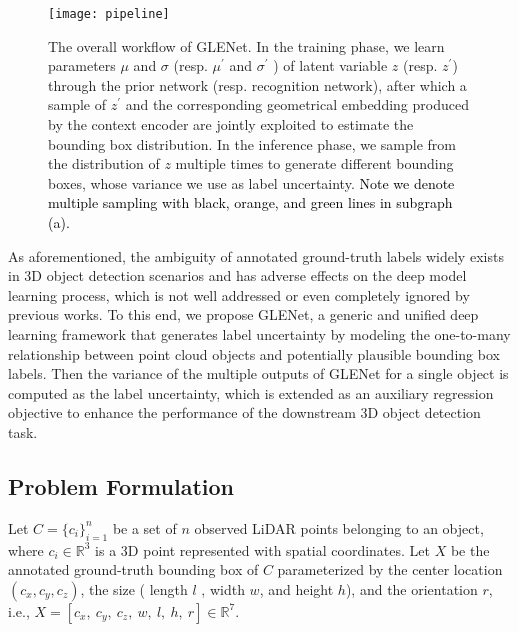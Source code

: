 \documentclass[twocolumn]{svjour3}
\newcommand{\revise}[1]{\textcolor{black}{#1}}
\begin{document}
\begin{figure*}[htp]
\centering
\texttt{[image: pipeline]} \caption{
The overall workflow of GLENet. In the training phase, we learn parameters $\mu$ and $\sigma$ (resp. $\mu^{\prime}$ and $\sigma^{\prime}$ ) of latent variable $z$ (resp. $z^{\prime}$) through the prior network (resp. recognition network), after which a sample of $z^{\prime}$ and the corresponding geometrical embedding produced by the context encoder are jointly exploited to estimate the bounding box distribution. In the inference phase, we sample from the distribution of $z$ multiple times to generate different bounding boxes, whose variance we use as label uncertainty. \revise{Note we denote multiple sampling with black, orange, and green lines in subgraph (a).}
}
\label{fig:pipeline}
\end{figure*}

As aforementioned, the ambiguity of annotated ground-truth labels widely exists in 3D object detection scenarios and has adverse effects on the deep model learning process, which is not well addressed or even completely ignored by previous works. To this end, we propose GLENet, a generic and unified deep learning framework that generates label uncertainty by modeling the one-to-many relationship between point cloud objects and potentially plausible bounding box labels.
Then the variance of the multiple outputs of GLENet for a single object is computed as the label uncertainty, which is extended as an auxiliary regression objective to enhance the performance of the downstream 3D object detection task.










\subsection{Problem Formulation } Let $C=\{c_i\}^n_{i=1}$ be a set of $n$ observed LiDAR points belonging to an object, where $c_i \in \mathbb{R}^{3}$ is a 3D point represented with spatial coordinates. Let $X$ be the annotated ground-truth bounding box of $C$ parameterized by the center location $(c_x,c_y,c_z)$, the size ( length $l$ , width $w$, and height $h$), and the orientation $r$, i.e., $X=[c_x,~c_y,~c_z,~w,~l,~h,~r]\in \mathbb{R}^{7}$.
\end{document}
